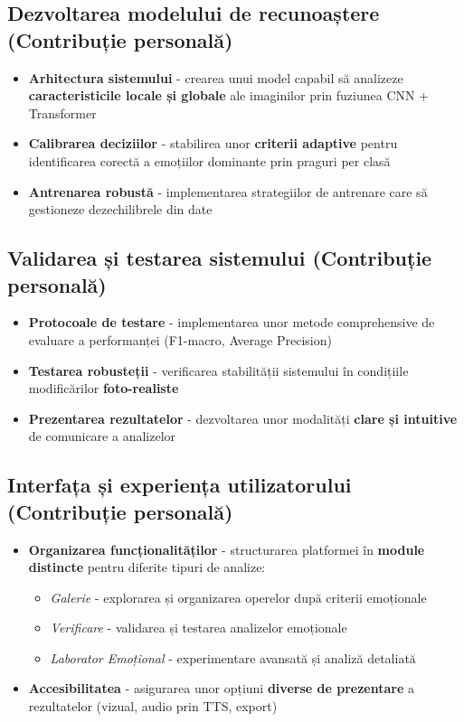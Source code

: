 \subsection{Dezvoltarea modelului de recunoaștere (Contribuție personală)}
\begin{itemize}
  \item \textbf{Arhitectura sistemului} - crearea unui model capabil să analizeze \textbf{caracteristicile locale și globale} ale imaginilor prin fuziunea CNN + Transformer
  \item \textbf{Calibrarea deciziilor} - stabilirea unor \textbf{criterii adaptive} pentru identificarea corectă a emoțiilor dominante prin praguri per clasă
  \item \textbf{Antrenarea robustă} - implementarea strategiilor de antrenare care să gestioneze dezechilibrele din date
\end{itemize}

\subsection{Validarea și testarea sistemului (Contribuție personală)}
\begin{itemize}
  \item \textbf{Protocoale de testare} - implementarea unor metode comprehensive de evaluare a performanței (F1-macro, Average Precision)
  \item \textbf{Testarea robusteții} - verificarea stabilității sistemului în condițiile modificărilor \textbf{foto-realiste}
  \item \textbf{Prezentarea rezultatelor} - dezvoltarea unor modalități \textbf{clare și intuitive} de comunicare a analizelor
\end{itemize}

\subsection{Interfața și experiența utilizatorului (Contribuție personală)}
\begin{itemize}
  \item \textbf{Organizarea funcționalităților} - structurarea platformei în \textbf{module distincte} pentru diferite tipuri de analize:
  \begin{itemize}
    \item \emph{Galerie} - explorarea și organizarea operelor după criterii emoționale
    \item \emph{Verificare} - validarea și testarea analizelor emoționale
    \item \emph{Laborator Emoțional} - experimentare avansată și analiză detaliată
  \end{itemize}
  \item \textbf{Accesibilitatea} - asigurarea unor opțiuni \textbf{diverse de prezentare} a rezultatelor (vizual, audio prin TTS, export)
\end{itemize}


